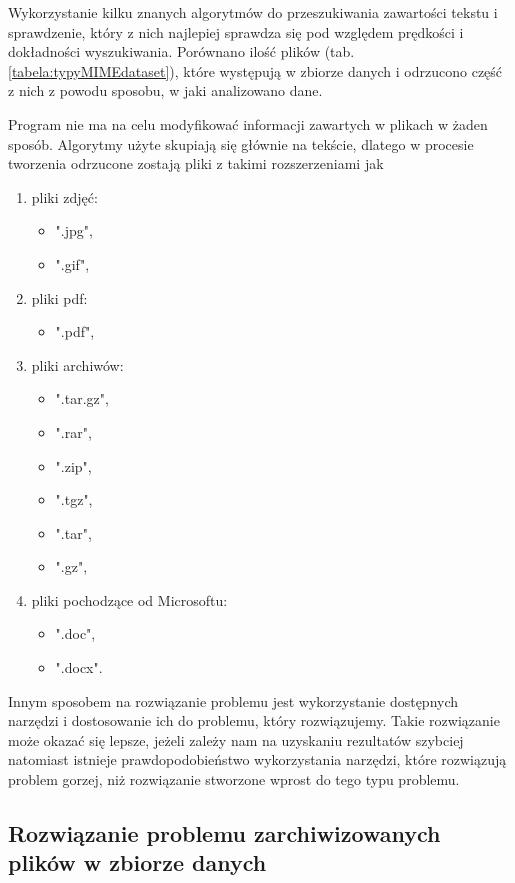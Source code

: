 Wykorzystanie kilku znanych algorytmów do przeszukiwania zawartości
tekstu i sprawdzenie, który z nich najlepiej sprawdza się pod względem prędkości
i dokładności wyszukiwania. Porównano ilość plików (tab. \ref{tabela:typyMIMEdataset}),
które występują w zbiorze danych i odrzucono część z nich z powodu sposobu, w jaki
analizowano dane.

Program nie ma na celu modyfikować informacji zawartych w plikach w żaden sposób.
Algorytmy użyte skupiają się głównie na tekście, dlatego w procesie tworzenia 
odrzucone zostają pliki z takimi rozszerzeniami jak
\begin{enumerate}
  \item pliki zdjęć:
  \begin{itemize}
    \item ".jpg",  
    \item ".gif",
  \end{itemize}
  \item pliki pdf:
  \begin{itemize}
    \item ".pdf",
  \end{itemize}
  \item pliki archiwów:
  \begin{itemize}
    \item ".tar.gz",
    \item ".rar", 
    \item ".zip",
    \item ".tgz",
    \item ".tar",
    \item ".gz",
  \end{itemize}
  \item pliki pochodzące od Microsoftu:
  \begin{itemize}
    \item ".doc", 
    \item ".docx".
  \end{itemize}
\end{enumerate}

Innym sposobem na rozwiązanie problemu jest wykorzystanie dostępnych narzędzi i
dostosowanie ich do problemu, który rozwiązujemy. Takie rozwiązanie może okazać
się lepsze, jeżeli zależy nam na uzyskaniu rezultatów szybciej natomiast istnieje 
prawdopodobieństwo wykorzystania narzędzi, które rozwiązują problem gorzej,
niż rozwiązanie stworzone wprost do tego typu problemu.

\subsection{Rozwiązanie problemu zarchiwizowanych plików w zbiorze danych}

